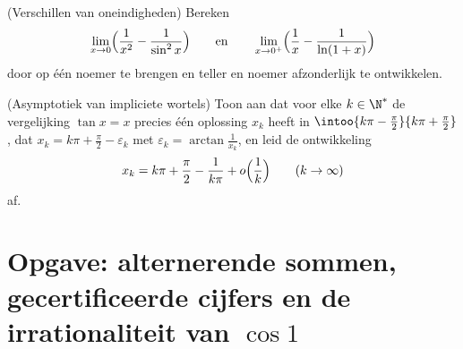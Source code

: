 \begin{exercise}[$\star\star$]\label{exo:b1:taylor:11}
(Verschillen van oneindigheden) Bereken
\[
\lim_{x \to 0} \Bigl(\frac{1}{x^2} - \frac{1}{\sin^2 x}\Bigr)
\qquad\text{en}\qquad
\lim_{x \to 0^+} \Bigl(\frac 1x - \frac{1}{\ln(1 + x)}\Bigr)
\]
door op één noemer te brengen en teller en noemer afzonderlijk te
ontwikkelen.
\end{exercise}

\begin{exercise}[$\star\star\star$]\label{exo:b1:taylor:12}
(Asymptotiek van impliciete wortels) Toon aan dat voor elke $k \in
\N^*$ de vergelijking $\tan x = x$ precies één oplossing $x_k$
heeft in $\intoo{k\pi - \frac\pi2}{k\pi + \frac\pi2}$, dat $x_k =
k\pi + \frac\pi2 - \varepsilon_k$ met $\varepsilon_k =
\arctan\frac{1}{x_k}$, en leid de ontwikkeling
\[
x_k = k\pi + \frac\pi2 - \frac{1}{k\pi} + o\Bigl(\frac
1k\Bigr) \qquad (k \to \infty)
\]
af.
\end{exercise}

\section{Opgave: alternerende sommen, gecertificeerde cijfers en de
irrationaliteit van $\cos 1$}

